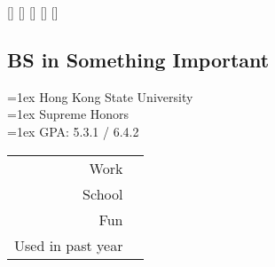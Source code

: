 \documentclass{resume}
\begin{document}
\sffamily



\begin{headerstyle}

\makeheader%
  {\myfirstname}%
  {\mylastname}%
  [\myhomepage]%
  [\myemail]%
  [\myphone]%
  []%
  [\mygitlab]

\end{headerstyle}



\noindent
\begin{minipage}[t]{0.3\textwidth}



\begin{resumestyle}

\subsection{BS in Something Important}
\hangindent=1ex Hong Kong State University \\
\hangindent=1ex Supreme Honors \\
\hangindent=1ex GPA:\hspace{.5ex} 5.3.1 / 6.4.2

\end{resumestyle}



\begin{resumestyle}

\small{\begin{tabular}{rl}
  Work & \workdot{} \\
  School & \schooldot{} \\
  Fun & \hobbydot{} \\
  Used in past year & \specialstar{} \\
\end{tabular}}
\sectionsep{}


\end{resumestyle}
\end{minipage}
\end{document}
